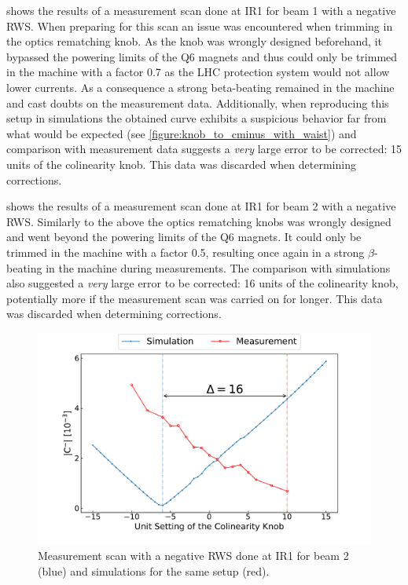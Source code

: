  shows the results of a measurement scan done at IR\num{1} for beam \num{1} with a negative RWS.
When preparing for this scan an issue was encountered when trimming in the optics rematching knob.
As the knob was wrongly designed beforehand, it bypassed the powering limits of the Q\num{6} magnets and thus could only be trimmed in the machine with a factor \num{0.7} as the LHC protection system would not allow lower currents.
As a consequence a strong \gls{beta-beating} remained in the machine and cast doubts on the measurement data. 
Additionally, when reproducing this setup in simulations the obtained  curve exhibits a suspicious behavior far from what would be expected (see \cref{figure:knob_to_cminus_with_waist}) and comparison with measurement data suggests a \textit{very} large error to be corrected: \num{15} units of the colinearity knob.
This data was discarded when determining corrections.

 shows the results of a measurement scan done at IR\num{1} for beam \num{2} with a negative RWS.
Similarly to the above the optics rematching knobs was wrongly designed and went beyond the powering limits of the Q\num{6} magnets.
It could only be trimmed in the machine with a factor \num{0.5}, resulting once again in a strong \(\beta\)-beating in the machine during measurements.
The comparison with simulations also suggested a \textit{very} large error to be corrected: \num{16} units of the colinearity knob, potentially more if the measurement scan was carried on for longer.
This data was discarded when determining corrections.

\begin{figure}[!htb]
    \centering
    \includegraphics*[width=\textwidth]{Figures/Appendices/rws_measurement_ir1_b2_neg.pdf}
    \caption{Measurement scan with a negative RWS done at IR\num{1} for beam \num{2} (\textcolor{mplblue}{blue}) and simulations for the same setup (\textcolor{mplr}{red}).}
    \label{figure:ir1_b2_neg_measurement}
\end{figure}

